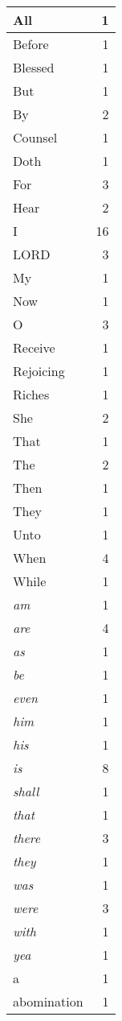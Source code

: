 \begin{center}
\begin{longtable}{l|r}
All & 1\\ \hline 
Before & 1\\ \hline 
Blessed & 1\\ \hline 
But & 1\\ \hline 
By & 2\\ \hline 
Counsel & 1\\ \hline 
Doth & 1\\ \hline 
For & 3\\ \hline 
Hear & 2\\ \hline 
I & 16\\ \hline 
LORD & 3\\ \hline 
My & 1\\ \hline 
Now & 1\\ \hline 
O & 3\\ \hline 
Receive & 1\\ \hline 
Rejoicing & 1\\ \hline 
Riches & 1\\ \hline 
She & 2\\ \hline 
That & 1\\ \hline 
The & 2\\ \hline 
Then & 1\\ \hline 
They & 1\\ \hline 
Unto & 1\\ \hline 
When & 4\\ \hline 
While & 1\\ \hline 
\emph{am} & 1\\ \hline 
\emph{are} & 4\\ \hline 
\emph{as} & 1\\ \hline 
\emph{be} & 1\\ \hline 
\emph{even} & 1\\ \hline 
\emph{him} & 1\\ \hline 
\emph{his} & 1\\ \hline 
\emph{is} & 8\\ \hline 
\emph{shall} & 1\\ \hline 
\emph{that} & 1\\ \hline 
\emph{there} & 3\\ \hline 
\emph{they} & 1\\ \hline 
\emph{was} & 1\\ \hline 
\emph{were} & 3\\ \hline 
\emph{with} & 1\\ \hline 
\emph{yea} & 1\\ \hline 
a & 1\\ \hline 
abomination & 1\\ \hline 

\end{longtable}
\end{center}
